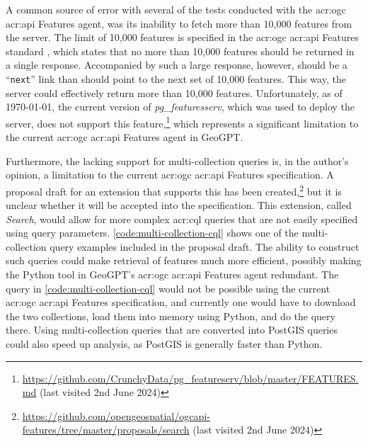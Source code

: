 A common source of error with several of the tests conducted with the \acrshort{acr:ogc} \acrshort{acr:api} Features agent, was its inability to fetch more than 10,000 features from the server. The limit of 10,000 features is specified in the \acrshort{acr:ogc} \acrshort{acr:api} Features standard \citep{opengeospatialconsortiumOGCAPIFeatures2022}, which states that no more than 10,000 features should be returned in a single response. Accompanied by such a large response, however, should be a \enquote{\texttt{next}} link than should point to the next set of 10,000 features. This way, the server could effectively return more than 10,000 features. Unfortunately, as of \today, the current version of \textit{pg\_featuresserv}, which was used to deploy the server, does not support this feature,\footnote{\url{https://github.com/CrunchyData/pg_featureserv/blob/master/FEATURES.md} (last visited 2nd June 2024)} which represents a significant limitation to the current \acrshort{acr:ogc} \acrshort{acr:api} Features agent in GeoGPT.

Furthermore, the lacking support for multi-collection queries is, in the author's opinion, a limitation to the current \acrshort{acr:ogc} \acrshort{acr:api} Features specification. A proposal draft for an extension that supports this has been created,\footnote{\url{https://github.com/opengeospatial/ogcapi-features/tree/master/proposals/search} (last visited 2nd June 2024)} but it is unclear whether it will be accepted into the specification. This extension, called \textit{Search}, would allow for more complex \acrshort{acr:cql} queries that are not easily specified using query parameters. \autoref{code:multi-collection-cql} shows one of the multi-collection query examples included in the proposal draft. The ability to construct such queries could make retrieval of features much more efficient, possibly making the Python tool in GeoGPT's \acrshort{acr:ogc} \acrshort{acr:api} Features agent redundant. The query in \autoref{code:multi-collection-cql} would not be possible using the current \acrshort{acr:ogc} \acrshort{acr:api} Features specification, and currently one would have to download the two collections, load them into memory using Python, and do the query there. Using multi-collection queries that are converted into PostGIS queries could also speed up analysis, as PostGIS is generally faster than Python.


